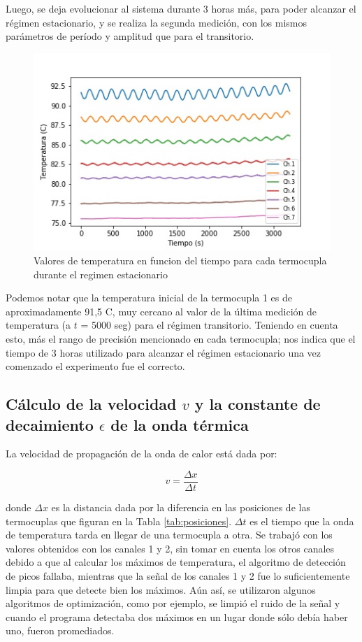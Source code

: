 \documentclass[twoside,twocolumn,a4paper]{article}
\begin{document}
Luego, se deja evolucionar al sistema durante 3 horas m\'as, para poder alcanzar el r\'egimen estacionario, y se realiza la segunda medici\'on, con los mismos par\'ametros de per\'iodo y amplitud que para el transitorio.

\begin{figure}[H]
\includegraphics[width=\linewidth]{Tvst.jpg}
\caption{Valores de temperatura en funcion del tiempo para cada termocupla durante el regimen estacionario}
\label{fig:Tvst_estacionario}
\end{figure}


Podemos notar que la temperatura inicial de la termocupla 1 es de aproximadamente 91,5 \degree C, muy cercano al valor de la \'ultima medici\'on de temperatura (a $t$ = 5000 seg) para el r\'egimen transitorio. Teniendo en cuenta esto, m\'as el rango de precisi\'on mencionado en cada termocupla; nos indica que el tiempo de 3 horas utilizado para alcanzar el r\'egimen estacionario una vez comenzado el experimento fue el correcto.

\subsection{C\'alculo de la velocidad $v$ y la constante de decaimiento $\epsilon$ de la onda t\'ermica}


La velocidad de propagaci\'on de la onda de calor est\'a dada por:

\begin{equation}
\label{eq:velocidad}
v = \frac{\Delta x}{\Delta t}
\end{equation}

donde $\Delta x$ es la distancia dada por la diferencia en las posiciones de las termocuplas que figuran en la Tabla \ref{tab:posiciones}. $\Delta t$ es el tiempo que la onda de temperatura tarda en llegar de una termocupla a otra. Se trabaj\'o con los valores obtenidos con los canales 1 y 2, sin tomar en cuenta los otros canales debido a que al calcular los m\'aximos de temperatura, el algoritmo de detecci\'on de picos fallaba, mientras que la se\~nal de los canales 1 y 2 fue lo suficientemente limpia para que detecte bien los m\'aximos. A\'un as\'i, se utilizaron algunos algoritmos de optimizaci\'on, como por ejemplo, se limpi\'o el ruido de la se\~nal y cuando el programa detectaba dos m\'aximos en un lugar donde s\'olo deb\'ia haber uno, fueron promediados. \newline
\end{document}
